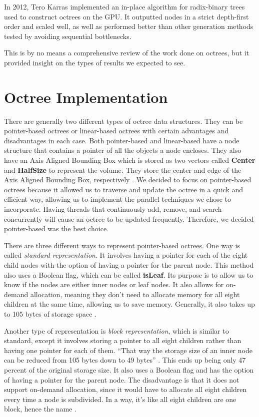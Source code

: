 \documentclass[conference]{IEEEtran}
\begin{document}
In 2012, Tero Karras \cite{Karras} implemented an in-place algorithm for radix-binary trees used to construct octrees on the GPU. It outputted nodes in a strict depth-first order and scaled well, as well as performed better than other generation methods tested by avoiding sequential bottlenecks. 

This is by no means a comprehensive review of the work done on octrees, but it provided insight on the types of results we expected to see. 

\section{Octree Implementation} \label{sec:sec3}
There are generally two different types of octree data structures. They can be pointer-based octrees or linear-based octrees with certain advantages and disadvantages in each case. Both pointer-based and linear-based have a node structure that contains a pointer of all the objects a node encloses. They also have an Axis Aligned Bounding Box which is stored as two vectors called \textbf{Center} and \textbf{HalfSize} to represent the volume. They store the center and edge of the Axis Aligned Bounding Box, respectively \cite{octrees2}. We decided to focus on pointer-based octrees because it allowed us to traverse and update the octree in a quick and efficient way, allowing us to implement the parallel techniques we chose to incorporate. Having threads that continuously add, remove, and search concurrently will cause an octree to be updated frequently. Therefore, we decided pointer-based was the best choice.

There are three different ways to represent pointer-based octrees. One way is called \textit{standard representation}. It involves having a pointer for each of the eight child nodes with the option of having a pointer for the parent node. This method also uses a Boolean flag, which can be called \textbf{isLeaf}. Its purpose is to allow us to know if the nodes are either inner nodes or leaf nodes. It also allows for on-demand allocation, meaning they don't need to allocate memory for all eight children at the same time, allowing us to save memory. Generally, it also takes up to 105 bytes of storage space \cite{octrees2}.

Another type of representation is \textit{block representation}, which is similar to standard, except it involves storing a pointer to all eight children rather than having one pointer for each of them. “That way the storage size of an inner node can be reduced from 105 bytes down to 49 bytes” \cite[para. 7]{octrees2}. This ends up being only 47 percent of the original storage size. It also uses a Boolean flag and has the option of having a pointer for the parent node. The disadvantage is that it does not support on-demand allocation, since it would have to allocate all eight children every time a node is subdivided. In a way, it's like all eight children are one block, hence the name \cite{octrees2}.
\end{document}
